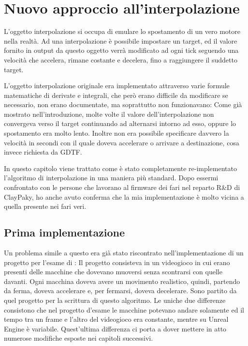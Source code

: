 \documentclass[main.tex]{subfiles}
\begin{document}
\sloppy

\vspace{1.0cm}

\section{Nuovo approccio all'interpolazione}\label{sec:Interpolation}
\lstset{language=UEcpp}
L'oggetto interpolazione si occupa di emulare lo spostamento di un vero motore nella realtà. Ad una interpolazione è possibile impostare un target, ed il valore fornito in output da questo oggetto verrà modificato ad ogni tick seguendo una velocità che accelera, rimane costante e decelera, fino a raggiungere il suddetto target.

L'oggetto interpolazione originale era implementato attraverso varie formule matematiche di derivate e integrali, che però erano difficile da modificare se necessario, non erano documentate, ma soprattutto non funzionavano: Come già mostrato nell'introduzione, molte volte il valore dell'interpolazione non convergeva verso il target continuando ad alternarsi intorno ad esso, oppure lo spostamento era molto lento. Inoltre non era possibile specificare davvero la velocità in secondi con il quale doveva accelerare o arrivare a destinazione, cosa invece richiesta da GDTF.\newline

In questo capitolo viene trattato come è stato completamente re-implementato l'algoritmo di interpolazione in una maniera più standard. Dopo essermi confrontato con le persone che lavorano al firmware dei fari nel reparto R\&D di ClayPaky, ho anche avuto conferma che la mia implementazione è molto vicina a quella presente nei fari veri.

\subsection{Prima implementazione}\label{subsec:4_trafficImplementation}
Un problema simile a questo era già stato riscontrato nell'implementazione di un progetto per l'esame di  \cite{TrafficGame}: Il progetto consisteva in un videogioco in cui erano presenti delle macchine che dovevano muoversi senza scontrarsi con quelle davanti. Ogni macchina doveva avere un movimento realistico, quindi, partendo da ferma, doveva accelerare e, per fermarsi, doveva decelerare. Sono partito da quel progetto per la scrittura di questo algoritmo. Le uniche due differenze consistono che nel progetto d'esame le macchine potevano andare solamente  ed il tempo tra un frame e l'altro del videogioco era constante, mentre su Unreal Engine è variabile. Quest'ultima differenza ci porta a dover mettere in atto numerose modifiche esposte nei capitoli successivi.\newline
\end{document}
